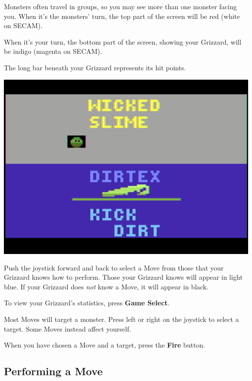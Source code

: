 \documentclass[10pt,twocolumn,openany,article]{memoir}
\begin{document}
Monsters often  travel in groups, so  you may see more  than one monster
facing you.  When it's the  monsters' turn, the  top part of  the screen
will be red (white on SECAM).

When  it's your  turn,  the  bottom part  of  the  screen, showing  your
Grizzard, will be indigo (magenta on SECAM).

The long bar beneath your Grizzard represents its hit points.

\begin{center}
  \includegraphics[width=\columnwidth]{../Manual/GrizzardCombatNTSC.png}
\end{center}

Push the joystick forward and back to select a Move from those that your
Grizzard knows how to perform. Those  your Grizzard knows will appear in
light blue. If your Grizzard does \emph{not} know a Move, it will appear
in black.

To view your Grizzard's statistics, press \textbf{Game Select}.

Most Moves will target a monster. Press left or right on the joystick to
select a target. Some Moves instead affect yourself.

When   you   have   chosen   a    Move   and   a   target,   press   the
\textbf{Fire} button.


\subsection{Performing a Move}
\end{document}
